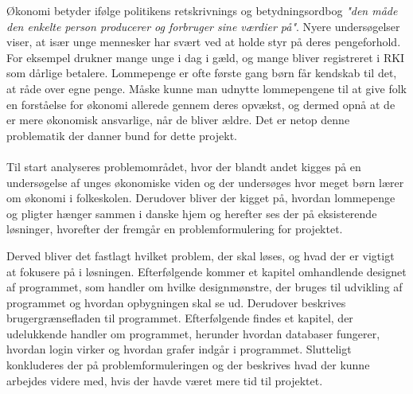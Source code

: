 Økonomi betyder ifølge politikens retskrivnings og betydningsordbog \textit{"den måde den enkelte person producerer og forbruger sine værdier på"}. Nyere undersøgelser viser, at især unge mennesker har svært ved at holde styr på deres pengeforhold. For eksempel drukner mange unge i dag i gæld, og mange bliver registreret i RKI som dårlige betalere.
Lommepenge er ofte første gang børn får kendskab til det, at råde over egne penge. Måske kunne man udnytte lommepengene til at give folk en forståelse for økonomi allerede gennem deres opvækst, og dermed opnå at de er mere økonomisk ansvarlige, når de bliver ældre. Det er netop denne problematik der danner bund for dette projekt.\\
\\
Til start analyseres problemområdet, hvor der blandt andet kigges på en undersøgelse af unges økonomiske viden og der undersøges hvor meget børn lærer om økonomi i folkeskolen. Derudover bliver der kigget på, hvordan lommepenge og pligter hænger sammen i danske hjem og herefter ses der på eksisterende løsninger, hvorefter der fremgår en problemformulering for projektet.

Derved bliver det fastlagt hvilket problem, der skal løses, og hvad der er vigtigt at fokusere på i løsningen. Efterfølgende kommer et kapitel omhandlende designet af programmet, som handler om hvilke designmønstre, der bruges til udvikling af programmet og hvordan opbygningen skal se ud. Derudover beskrives brugergrænsefladen til programmet. Efterfølgende findes et kapitel, der udelukkende handler om programmet, herunder hvordan databaser fungerer, hvordan login virker og hvordan grafer indgår i programmet. Slutteligt konkluderes der på problemformuleringen og der beskrives hvad der kunne arbejdes videre med, hvis der havde været mere tid til projektet. 

